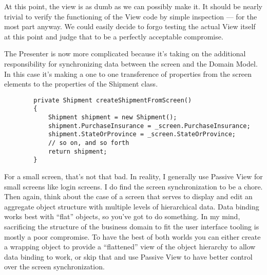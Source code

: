 \documentclass{article}
\begin{document}
{At this point, the view is as dumb as we can possibly make it.  It should be nearly trivial to verify the functioning of the View code by simple inspection — for the most part anyway.  We could easily decide to forgo testing the actual View itself at this point and judge that to be a perfectly acceptable compromise.

The Presenter is now more complicated because it's taking on the additional responsibility for synchronizing data between the screen and the Domain Model.  In this case it's making a one to one transference of properties from the screen elements to the properties of the Shipment class.
\begin{lstlisting}
        private Shipment createShipmentFromScreen()
        {
            Shipment shipment = new Shipment();
            shipment.PurchaseInsurance = _screen.PurchaseInsurance;
            shipment.StateOrProvince = _screen.StateOrProvince;
            // so on, and so forth
            return shipment;
        }
\end{lstlisting}

For a small screen, that's not that bad.  In reality, I generally use Passive View for small screens like login screens.  I do find the screen synchronization to be a chore.  Then again, think about the case of a screen that serves to display and edit an aggregate object structure with multiple levels of hierarchical data.  Data binding works best with “flat” objects, so you've got to do something.  In my mind, sacrificing the structure of the business domain to fit the user interface tooling is mostly a poor compromise.  To have the best of both worlds you can either create a wrapping object to provide a “flattened” view of the object hierarchy to allow data binding to work, or skip that and use Passive View to have better control over the screen synchronization. 

}
\end{document}
